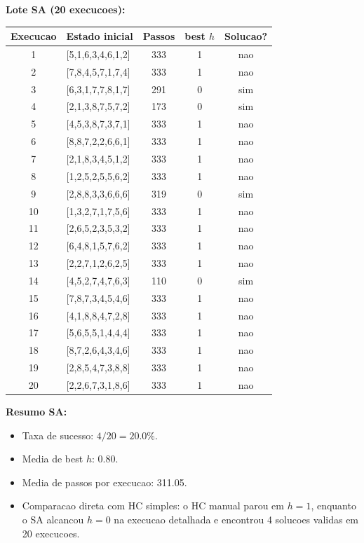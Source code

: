 \textbf{Lote SA (20 execucoes):}
\begingroup
\scriptsize
\begin{longtable}{c p{3.5cm} c c c}
\toprule
Execucao & Estado inicial & Passos & best $h$ & Solucao? \\
\midrule
1 & [5,1,6,3,4,6,1,2] & 333 & 1 & nao \\
2 & [7,8,4,5,7,1,7,4] & 333 & 1 & nao \\
3 & [6,3,1,7,7,8,1,7] & 291 & 0 & sim \\
4 & [2,1,3,8,7,5,7,2] & 173 & 0 & sim \\
5 & [4,5,3,8,7,3,7,1] & 333 & 1 & nao \\
6 & [8,8,7,2,2,6,6,1] & 333 & 1 & nao \\
7 & [2,1,8,3,4,5,1,2] & 333 & 1 & nao \\
8 & [1,2,5,2,5,5,6,2] & 333 & 1 & nao \\
9 & [2,8,8,3,3,6,6,6] & 319 & 0 & sim \\
10 & [1,3,2,7,1,7,5,6] & 333 & 1 & nao \\
11 & [2,6,5,2,3,5,3,2] & 333 & 1 & nao \\
12 & [6,4,8,1,5,7,6,2] & 333 & 1 & nao \\
13 & [2,2,7,1,2,6,2,5] & 333 & 1 & nao \\
14 & [4,5,2,7,4,7,6,3] & 110 & 0 & sim \\
15 & [7,8,7,3,4,5,4,6] & 333 & 1 & nao \\
16 & [4,1,8,8,4,7,2,8] & 333 & 1 & nao \\
17 & [5,6,5,5,1,4,4,4] & 333 & 1 & nao \\
18 & [8,7,2,6,4,3,4,6] & 333 & 1 & nao \\
19 & [2,8,5,4,7,3,8,8] & 333 & 1 & nao \\
20 & [2,2,6,7,3,1,8,6] & 333 & 1 & nao \\
\bottomrule
\end{longtable}
\endgroup

\textbf{Resumo SA:}
\begin{itemize}[leftmargin=1.5em]
  \item Taxa de sucesso: $4/20 = 20.0\%$.
  \item Media de best $h$: 0.80.
  \item Media de passos por execucao: 311.05.
  \item Comparacao direta com HC simples: o HC manual parou em $h=1$, enquanto o SA alcancou $h=0$ na execucao detalhada e encontrou 4 solucoes validas em 20 execucoes.
\end{itemize}

